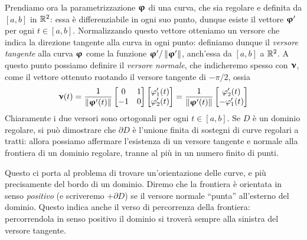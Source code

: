 Prendiamo ora la parametrizzazione $\bm{\upvarphi}$ di una curva, che sia regolare e definita da $[a,b]$ in $\mathbb{R}^2$: essa è differenziabile in ogni suo punto, dunque esiste il vettore $\bm{\upvarphi}'$ per ogni $t\in[a,b]$.
Normalizzando questo vettore otteniamo un versore che indica la direzione tangente alla curva in ogni punto: definiamo dunque il \emph{versore tangente} alla curva $\bm{\upvarphi}$ come la funzione $\bm{\upvarphi}'/\left\|{\bm{\upvarphi}'}\right\|$, anch'essa da $[a,b]$ a $\mathbb{R}^2$.
A questo punto possiamo definire il \emph{versore normale}, che indicheremo spesso con $\bm{\upnu}$, come il vettore ottenuto ruotando il versore tangente di $-\pi/2$, ossia
\begin{equation*}
	\bm{\upnu}(t)=\frac1{\left\|{\bm{\upvarphi}'(t)}\right\|}
	\begin{bmatrix}
		0&1\\-1&0
	\end{bmatrix}
	\begin{bmatrix}
		\varphi'_1(t)\\\varphi'_2(t)
	\end{bmatrix}
	=\frac1{\left\|{\bm{\upvarphi}'(t)}\right\|}
	\begin{bmatrix}
		\varphi'_2(t)\\-\varphi'_1(t)
	\end{bmatrix}
\end{equation*}
Chiaramente i due versori sono ortogonali per ogni $t\in[a,b]$.
Se $D$ è un dominio regolare, si può dimostrare che $\partial D$ è l'unione finita di sostegni di curve regolari a tratti: allora possiamo affermare l'esistenza di un versore tangente e normale alla frontiera di un dominio regolare, tranne al più in un numero finito di punti.

Questo ci porta al problema di trovare un'orientazione delle curve, e più precisamente del bordo di un dominio.
Diremo che la frontiera è orientata in senso \emph{positivo} (e scriveremo $+\partial D$) se il versore normale ``punta'' all'esterno del dominio.
Questo indica anche il verso di percorrenza della frontiera: percorrendola in senso positivo il dominio si troverà sempre alla sinistra del versore tangente.

